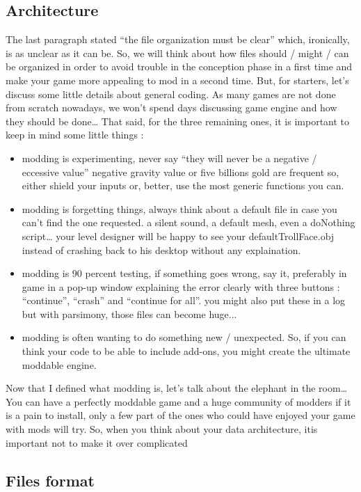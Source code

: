 \documentclass[a4paper,11pt]{article}
\begin{document}
\subsection{Architecture}
The last paragraph stated “the file organization must be clear” which, ironically, is as unclear as it can be. So, we will think about how files should / might / can be organized in order to avoid trouble in the conception phase in a first time and make your game more appealing to mod in a second time. But, for starters, let’s discuss some little details about general coding.
As many games are not done from scratch nowadays, we won’t spend days discussing game engine and how they should be done… That said, for the three remaining ones, it is important to keep in mind some little things :
\begin{itemize}
\item modding is experimenting, never say “they will never be a negative / eccessive value” negative gravity value or five billions gold are frequent so, either shield your inputs or, better, use the most generic functions you can.
\item modding is forgetting things, always think about a default file in case you can’t find the one requested. a silent sound, a default mesh, even a doNothing script… your level designer will be happy to see your defaultTrollFace.obj instead of crashing back to his desktop without any explaination.
\item modding is 90 percent testing, if something goes wrong, say it, preferably in game in a pop-up window explaining the error clearly with three buttons : “continue”, “crash” and “continue for all”. you might also put these in a log but with parsimony, those files can become huge...
\item modding is often wanting to do something new / unexpected. So, if you can think your code to be able to include add-ons, you might create the ultimate moddable engine.
\end{itemize}
Now that I defined what modding is, let’s talk about the elephant in the room… You can have a perfectly moddable game and a huge community of modders if it is a pain to install, only a few part of the ones who could have enjoyed your game with mods will try.
So, when you think about your data architecture, itis important not to make it over complicated

\subsection{Files format}
\end{document}
